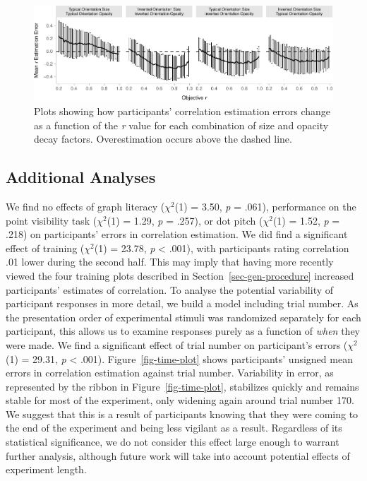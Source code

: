 \documentclass[sigconf]{acmart}
\begin{document}
\begin{figure}

{\centering \includegraphics[width=1\textwidth,height=\textheight]{size_and_opacity_files/figure-pdf/fig-diff-error-bars-plot-1.pdf}

}

\caption{\label{fig-diff-error-bars-plot}Plots showing how participants'
correlation estimation errors change as a function of the \emph{r} value
for each combination of size and opacity decay factors. Overestimation
occurs above the dashed line.}

\end{figure}

\hypertarget{sec-add-analyses}{%
\subsection{Additional Analyses}\label{sec-add-analyses}}

We find no effects of graph literacy (\(\chi^2\)(1) = 3.50, \emph{p} =
.061), performance on the point visibility task (\(\chi^2\)(1) = 1.29,
\emph{p} = .257), or dot pitch (\(\chi^2\)(1) = 1.52, \emph{p} = .218)
on participants' errors in correlation estimation. We did find a
significant effect of training (\(\chi^2\)(1) = 23.78, \emph{p}
\textless{} .001), with participants rating correlation .01 lower during
the second half. This may imply that having more recently viewed the
four training plots described in Section~\ref{sec-gen-procedure}
increased participants' estimates of correlation. To analyse the
potential variability of participant responses in more detail, we build
a model including trial number. As the presentation order of
experimental stimuli was randomized separately for each participant,
this allows us to examine responses purely as a function of \emph{when}
they were made. We find a significant effect of trial number on
participant's errors (\(\chi^2\)(1) = 29.31, \emph{p} \textless{} .001).
Figure~\ref{fig-time-plot} shows participants' unsigned mean errors in
correlation estimation against trial number. Variability in error, as
represented by the ribbon in Figure~\ref{fig-time-plot}, stabilizes
quickly and remains stable for most of the experiment, only widening
again around trial number 170. We suggest that this is a result of
participants knowing that they were coming to the end of the experiment
and being less vigilant as a result. Regardless of its statistical
significance, we do not consider this effect large enough to warrant
further analysis, although future work will take into account potential
effects of experiment length.
\end{document}
